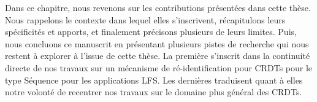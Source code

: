 Dans ce chapitre, nous revenons sur les contributions présentées dans cette thèse.
Nous rappelons le contexte dans lequel elles s'inscrivent, récapitulons leurs spécificités et apports, et finalement précisons plusieurs de leurs limites.
Puis, nous concluons ce manuscrit en présentant plusieurs pistes de recherche qui nous restent à explorer à l'issue de cette thèse.
La première s'inscrit dans la continuité directe de nos travaux sur un mécanisme de ré-identification pour \acp{CRDT} pour le type Séquence pour les applications \acf{LFS}.
Les dernières traduisent quant à elles notre volonté de recentrer nos travaux sur le domaine plus général des \acp{CRDT}.
